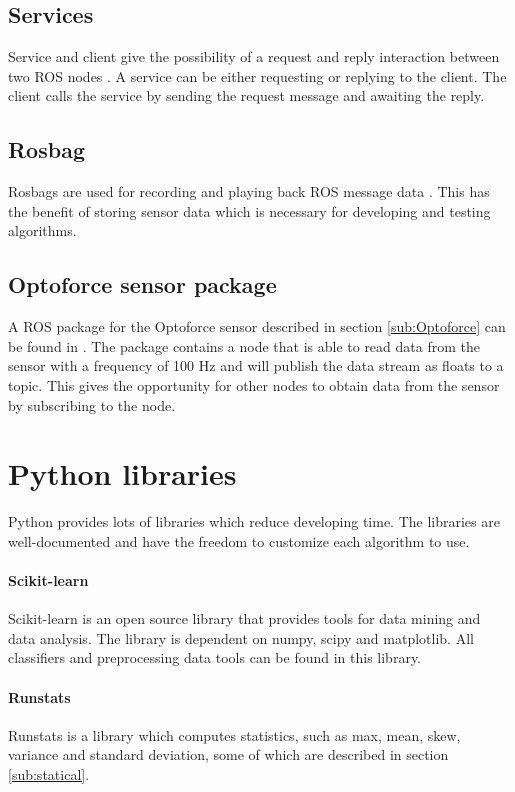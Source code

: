 \documentclass[USenglish]{ifimaster}  %
\begin{document}
\subsection{Services}\label{sub:service}
Service and client give the possibility of a request and reply interaction between two ROS nodes \cite{ROSconcept}. A service can be either requesting or replying to the client. The client calls the service by sending the request message and awaiting the reply.

\subsection{Rosbag}
Rosbags are used for recording and playing back ROS message data \cite{ROSconcept}. This has the benefit of storing sensor data which is necessary for developing and testing algorithms.


\subsection{Optoforce sensor package}  
A ROS package for the Optoforce sensor described in section \ref{sub:Optoforce} can be found in \cite{optoRos}. The package contains a node that is able to read data from the sensor with a frequency of 100 Hz and will publish the data stream as floats to a topic. This gives the opportunity for other nodes to obtain data from the sensor by subscribing to the node.

\section{Python libraries}
Python provides lots of libraries which reduce developing time. The libraries are well-documented and have the freedom to customize each algorithm to use.

\paragraph{Scikit-learn} \label{para:scikit}
Scikit-learn \cite{scikit-learn} is an open source library that provides tools for data mining and data analysis. The library is dependent on numpy, scipy and matplotlib. All classifiers and preprocessing data tools can be found in this library. 


\paragraph{Runstats}
Runstats \cite{runstats} is a library which computes statistics, such as max, mean, skew, variance and standard deviation, some of which are described in section \ref{sub:statical}.
\end{document}
